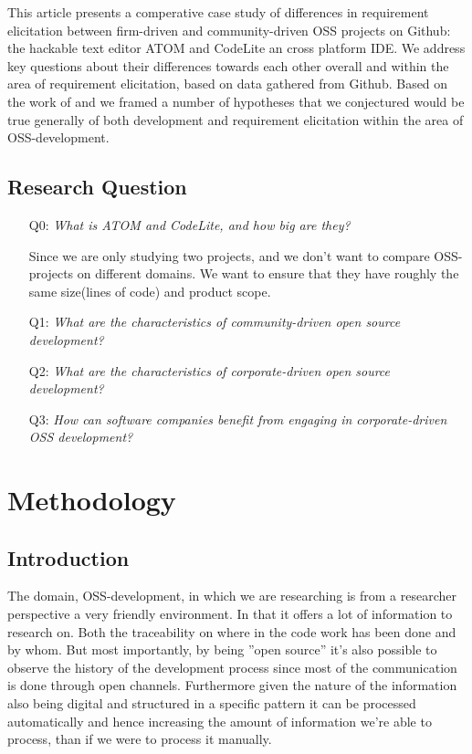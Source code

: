\documentclass[a4paper,11pt]{article}
\begin{document}
{This article presents a comperative case study of differences in requirement elicitation between firm-driven and community-driven OSS projects on Github: the hackable text editor ATOM and CodeLite an cross platform IDE. We address key questions about their differences towards each other overall and within the area of requirement elicitation, based on data gathered from Github. Based on the work of \cite{Mockus2002a} and \cite{Noll} we framed a number of hypotheses that we conjectured would be true generally of both development and requirement elicitation within the area of OSS-development. 


\subsection{Research Question}
\begin{itemize}
	\item[Q0:]\emph{What is ATOM and CodeLite, and how big are they?} 
	
	Since we are only studying two projects, and we don't want to compare OSS-projects on different domains. We want to ensure that they have roughly the same size(lines of code) and product scope.
	\item[Q1:]\emph{What are the characteristics of community-driven open source development?}
	\item[Q2:]\emph{What are the characteristics of corporate-driven open source development?}
	\item[Q3:]\emph{How can software companies benefit from engaging in corporate-driven OSS development?}
\end{itemize}

\section{Methodology}
\subsection{Introduction}
The domain, OSS-development, in which we are researching is from a researcher perspective a very friendly environment. In that it offers a lot of information to research on. Both the traceability on where in the code work has been done and by whom. But most importantly, by being ''open source'' it's also possible to observe the history of the development process since most of the communication is done through open channels. Furthermore given the nature of the information also being digital and structured in a specific pattern it can be processed automatically and hence increasing the amount of information we're able to process, than if we were to process it manually.

}
\end{document}
